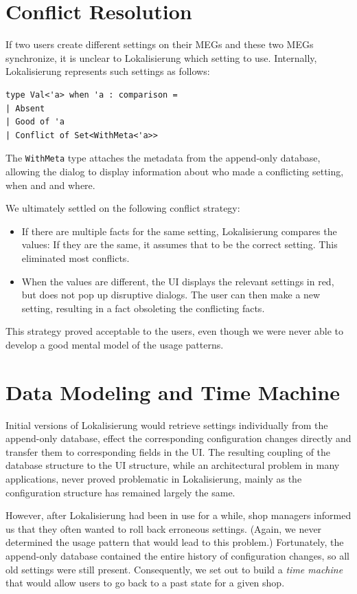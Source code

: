\documentclass[sigplan,review]{acmart}
\begin{document}
\section{Conflict Resolution}
\label{sec:conflicts}

If two users create different settings on their MEGs and these two
MEGs synchronize, it is unclear to Lokalisierung which setting to use.
Internally, Lokalisierung represents such settings as follows:
%
\begin{verbatim}
type Val<'a> when 'a : comparison =
| Absent
| Good of 'a
| Conflict of Set<WithMeta<'a>>
\end{verbatim}
%
The \texttt{WithMeta} type attaches the metadata from the append-only
database, allowing the dialog to display information about who made a
conflicting setting, when and and where.

We ultimately settled on the following conflict strategy:
%
\begin{itemize}
\item If there are multiple facts for the same setting, Lokalisierung
  compares the values: If they are the same, it assumes that to be the
  correct setting. This eliminated most conflicts.
\item When the values are different, the UI displays the relevant
  settings in red, but does not pop up disruptive dialogs. The user
  can then make a new setting, resulting in a fact obsoleting the
  conflicting facts.
\end{itemize}
%
This strategy proved acceptable to the users, even though we were
never able to develop a good mental model of the usage
patterns.

\section{Data Modeling and Time Machine}
\label{sec:time-machine}

Initial versions of Lokalisierung would retrieve settings individually
from the append-only database, effect the corresponding configuration
changes directly and transfer them to corresponding fields in the
UI. The resulting coupling of the database structure to the UI
structure, while an architectural problem in many applications, never
proved problematic in Lokalisierung, mainly as the configuration
structure has remained largely the same.

However, after Lokalisierung had been in use for a while, shop
managers informed us that they often wanted to roll back erroneous
settings.  (Again, we never determined the usage pattern that would
lead to this problem.)  Fortunately, the append-only database
contained the entire history of configuration changes, so all old
settings were still present.  Consequently, we set out to build a
\textit{time machine} that would allow users to go back to a past
state for a given shop.
\end{document}
